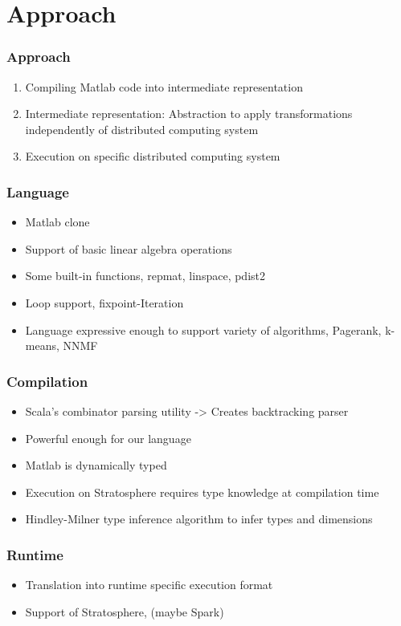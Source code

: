 \section{Approach}

\begin{frame}
	\frametitle{Approach}
	\begin{enumerate}
		\item Compiling Matlab code into intermediate representation
		\item Intermediate representation: Abstraction to apply transformations independently of distributed computing system
		\item Execution on specific distributed computing system
	\end{enumerate}
\end{frame}

\begin{frame}
	\frametitle{Language}
	\begin{itemize}
		\item Matlab clone
		\item Support of basic linear algebra operations
		\item Some built-in functions, repmat, linspace, pdist2
		\item Loop support, fixpoint-Iteration
		\item Language expressive enough to support variety of algorithms, Pagerank, k-means, NNMF
	\end{itemize}
\end{frame}

\begin{frame}
	\frametitle{Compilation}
	\begin{itemize}
		\item Scala's combinator parsing utility -> Creates backtracking parser
		\item Powerful enough for our language
		\item Matlab is dynamically typed
		\item Execution on Stratosphere requires type knowledge at compilation time
		\item Hindley-Milner type inference algorithm to infer types and dimensions
	\end{itemize}
\end{frame}

\begin{frame}
	\frametitle{Runtime}
	\begin{itemize}
		\item Translation into runtime specific execution format
		\item Support of Stratosphere, (maybe Spark)
	\end{itemize}
\end{frame}